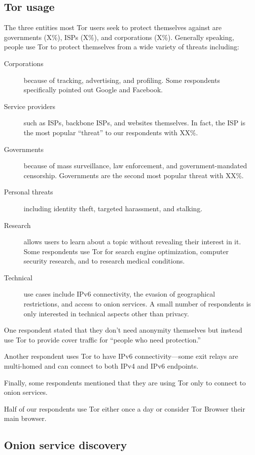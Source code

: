 \subsection{Tor usage}
The three entities most Tor users seek to protect themselves against are
governments (X\%), ISPs (X\%), and corporations (X\%).  Generally speaking,
people use Tor to protect themselves from a wide variety of threats including:
\begin{description}
    \item[Corporations] because of tracking, advertising, and profiling.  Some
        respondents specifically pointed out Google and Facebook.
    \item[Service providers] such as ISPs, backbone ISPs, and websites
        themselves.  In fact, the ISP is the most popular ``threat'' to our
        respondents with XX\%.
    \item[Governments] because of mass surveillance, law enforcement, and
        government-mandated censorship.  Governments are the second most
        popular threat with XX\%.
    \item[Personal threats] including identity theft, targeted harassment, and
        stalking.
    \item[Research] allows users to learn about a topic without revealing their
        interest in it.  Some respondents use Tor for search engine
        optimization, computer security research, and to research medical
        conditions.
    \item[Technical] use cases include IPv6 connectivity, the evasion of
        geographical restrictions, and access to onion services.  A small
        number of respondents is only interested in technical aspects other
        than privacy.
\end{description}

One respondent stated that they don't need anonymity themselves but instead use
Tor to provide cover traffic for ``people who need protection.''

Another respondent uses Tor to have IPv6 connectivity---some exit relays are
multi-homed and can connect to both IPv4 and IPv6 endpoints.

Finally, some respondents mentioned that they are using Tor only to connect to
onion services.

Half of our respondents use Tor either once a day or consider Tor Browser their
main browser.

\subsection{Onion service discovery}

